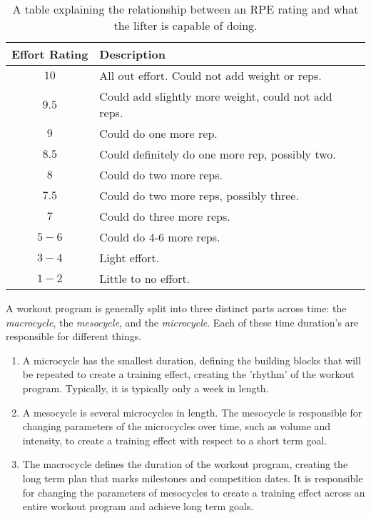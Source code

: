 \begin{table}[h]
    \centering
    \begin{tabular}{c|l}
        Effort Rating & Description \\
        \hline
        $10$ & All out effort. Could not add weight or reps. \\
        $9.5$ & Could add slightly more weight, could not add reps. \\
        $9$ & Could do one more rep. \\
        $8.5$ & Could definitely do one more rep, possibly two. \\
        $8$ & Could do two more reps. \\
        $7.5 $& Could do two more reps, possibly three. \\
        $7$ & Could do three more reps. \\
        $5-6$ & Could do 4-6 more reps. \\
        $3-4$ & Light effort. \\
        $1-2$ & Little to no effort.
    \end{tabular}
    \caption{A table explaining the relationship between an RPE rating and what the lifter is capable of doing.}
    \label{tab:RPETable}
\end{table}

A workout program is generally split into three distinct parts across time: the \textit{macrocycle}, the \textit{mesocycle}, and the \textit{microcycle}. Each of these time duration's are responsible for different things.

\begin{enumerate}
	\item A microcycle has the smallest duration, defining the building blocks that will be repeated to create a training effect, creating the 'rhythm' of the workout program. Typically, it is typically only a week in length. 
	\item A mesocycle is several microcycles in length. The mesocycle is responsible for changing parameters of the microcycles over time, such as volume and intensity, to create a training effect with respect to a short term goal.
	\item The macrocycle defines the duration of the workout program, creating the long term plan that marks milestones and competition dates. It is responsible for changing the parameters of mesocycles to create a training effect across an entire workout program and achieve long term goals.
\end{enumerate}

